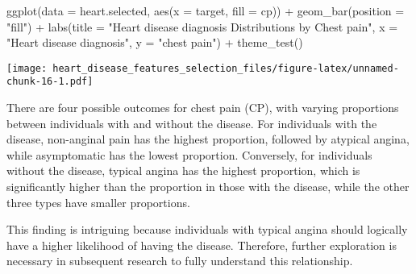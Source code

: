 \documentclass[
]{article}
\newenvironment{Shaded}{\begin{snugshade}}{\end{snugshade}}
\newcommand{\AttributeTok}[1]{\textcolor[rgb]{0.77,0.63,0.00}{#1}}
\newcommand{\ConstantTok}[1]{\textcolor[rgb]{0.00,0.00,0.00}{#1}}
\newcommand{\FunctionTok}[1]{\textcolor[rgb]{0.00,0.00,0.00}{#1}}
\newcommand{\NormalTok}[1]{#1}
\newcommand{\SpecialCharTok}[1]{\textcolor[rgb]{0.00,0.00,0.00}{#1}}
\newcommand{\StringTok}[1]{\textcolor[rgb]{0.31,0.60,0.02}{#1}}
\begin{document}
\begin{Shaded}
\begin{Highlighting}[]
\FunctionTok{ggplot}\NormalTok{(}\AttributeTok{data =}\NormalTok{ heart.selected, }\FunctionTok{aes}\NormalTok{(}\AttributeTok{x =}\NormalTok{ target, }\AttributeTok{fill =}\NormalTok{ cp)) }\SpecialCharTok{+} 
  \FunctionTok{geom\_bar}\NormalTok{(}\AttributeTok{position =} \StringTok{"fill"}\NormalTok{) }\SpecialCharTok{+}
  \FunctionTok{labs}\NormalTok{(}\AttributeTok{title =} \StringTok{"Heart disease diagnosis Distributions by Chest pain"}\NormalTok{,}
       \AttributeTok{x =} \StringTok{"Heart disease diagnosis"}\NormalTok{,}
       \AttributeTok{y =} \StringTok{"chest pain"}\NormalTok{) }\SpecialCharTok{+}
  \FunctionTok{theme\_test}\NormalTok{()}
\end{Highlighting}
\end{Shaded}

\texttt{[image: heart\_disease\_features\_selection\_files/figure-latex/unnamed-chunk-16-1.pdf]}

There are four possible outcomes for chest pain (CP), with varying
proportions between individuals with and without the disease. For
individuals with the disease, non-anginal pain has the highest
proportion, followed by atypical angina, while asymptomatic has the
lowest proportion. Conversely, for individuals without the disease,
typical angina has the highest proportion, which is significantly higher
than the proportion in those with the disease, while the other three
types have smaller proportions.

This finding is intriguing because individuals with typical angina
should logically have a higher likelihood of having the disease.
Therefore, further exploration is necessary in subsequent research to
fully understand this relationship.

\begin{Shaded}
\end{Shaded}
\end{document}
